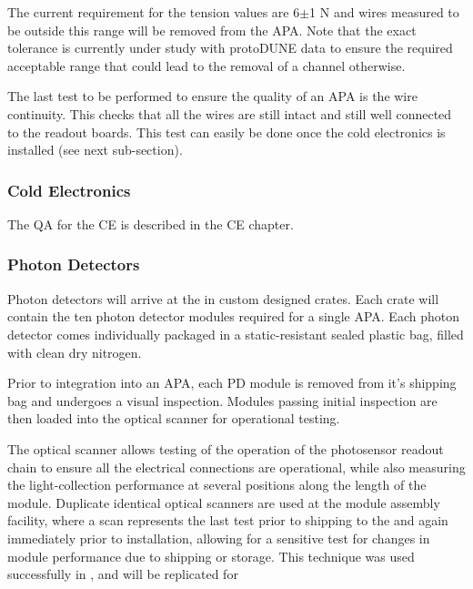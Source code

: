 The current requirement for the tension values are 6$\pm$1 N and wires measured to be outside this range will be removed from the APA. Note that the exact tolerance is currently under study with protoDUNE data to ensure the required acceptable range that could lead to the removal of a channel otherwise.

The last test to be performed to ensure the quality of an APA is the wire continuity. This checks that all the wires are still intact and still well connected to the readout boards. This test can easily be done once the cold electronics is installed (see next sub-section).    
\subsubsection{Cold Electronics}
The QA for the CE is described in the CE chapter.

\subsubsection{Photon Detectors}

Photon detectors will arrive at the  in custom designed crates.  Each crate will contain the ten photon detector modules required for a single APA.  
Each photon detector comes individually packaged in a static-resistant sealed plastic bag, filled with clean dry nitrogen.

Prior to integration into an APA, each PD module is removed from it's shipping bag and undergoes a visual inspection. 
Modules passing initial inspection are then loaded into the optical scanner for operational testing.

The  optical scanner allows testing of the operation of the photosensor readout chain to ensure all the electrical connections are operational, while also measuring the light-collection performance at several positions along the length of the module.  
Duplicate identical optical scanners are used at the module assembly facility, where a scan represents the last  test prior to shipping to the  and again immediately prior to installation, allowing for a sensitive test for changes in module performance due to shipping or storage.  
This technique was used successfully in , and will be replicated for 


